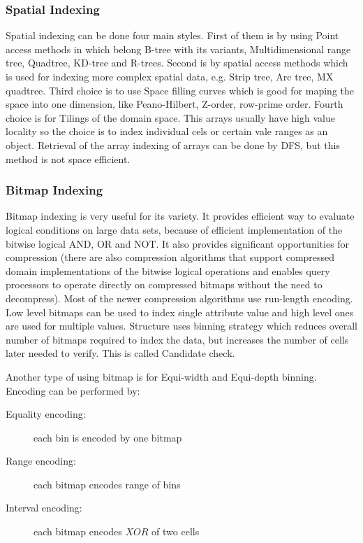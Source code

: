 \subsubsection{Spatial Indexing}
Spatial indexing can be done four main styles. First of them is by using Point access methods in which belong B-tree with its variants, Multidimensional range tree, Quadtree, KD-tree and R-trees. \cite{Rtree} Second is by spatial access methods which is used for indexing more complex spatial data, e.g. Strip tree, Arc tree, MX quadtree. Third choice is to use Space filling curves which is good for maping the space into one dimension, like Peano-Hilbert, Z-order, row-prime order. Fourth choice is for Tilings of the domain space.\cite{joinFractal} This arrays usually have high value locality so the choice is to index individual cels or certain vale ranges as an object. Retrieval of the array indexing of arrays can be done by DFS, but this method is not space efficient. \cite{MDindexingBTree}
\subsubsection{Bitmap Indexing}
Bitmap indexing is very useful for its variety. It provides efficient way to evaluate logical conditions on large data sets, because of efficient implementation of the bitwise logical AND, OR and NOT. It also provides significant opportunities for compression (there are also compression algorithms that support compressed domain implementations of the bitwise logical operations and enables query processors to operate directly on compressed bitmaps without the need to decompress). Most of the newer compression algorithms use run-length encoding. Low level bitmaps can be used to index single attribute value and high level ones are used for multiple values. Structure uses binning strategy which reduces overall number of bitmaps required to index the data, but increases the number of cells later needed to verify. This is called Candidate check. 

Another type of using bitmap is for Equi-width and Equi-depth binning. Encoding can be performed by:

\begin{description}
\item[Equality encoding:] each bin is encoded by one bitmap
\item[Range encoding: ] each bitmap encodes range of bins
\item[Interval encoding: ] each bitmap encodes $XOR$ of two cells
\end{description}

